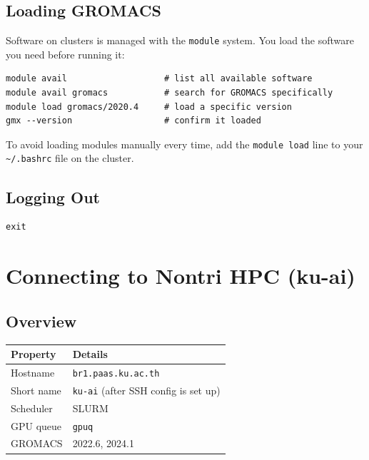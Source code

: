 \documentclass[12pt,a4paper]{article}
\newcommand{\tip}[1]{%
  \begin{tcolorbox}[tipstyle]
    #1
  \end{tcolorbox}
}
\newcommand{\cmd}[1]{\texttt{\textcolor{kugreen!70!black}{#1}}}
\begin{document}
\subsection{Loading GROMACS}

Software on clusters is managed with the \cmd{module} system. You load the
software you need before running it:

\begin{lstlisting}[style=bash]
module avail                   # list all available software
module avail gromacs           # search for GROMACS specifically
module load gromacs/2020.4     # load a specific version
gmx --version                  # confirm it loaded
\end{lstlisting}

\tip{
  To avoid loading modules manually every time, add the \cmd{module load}
  line to your \texttt{\textasciitilde/.bashrc} file on the cluster.
}

\subsection{Logging Out}

\begin{lstlisting}[style=bash]
exit
\end{lstlisting}

\section{Connecting to Nontri HPC (ku-ai)}

\subsection{Overview}

\begin{center}
\begin{tabular}{ll}
\toprule
\textbf{Property} & \textbf{Details} \\
\midrule
Hostname     & \texttt{br1.paas.ku.ac.th} \\
Short name   & \texttt{ku-ai} (after SSH config is set up) \\
Scheduler    & SLURM \\
GPU queue    & \texttt{gpuq} \\
GROMACS      & 2022.6, 2024.1 \\
\bottomrule
\end{tabular}
\end{center}
\end{document}
